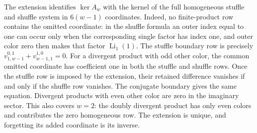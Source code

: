 \documentclass[11pt]{article}
\numberwithin{equation}{section}
\theoremstyle{plain}
\theoremstyle{definition}
\theoremstyle{remark}
\DeclareMathOperator{\Li}{Li}
\begin{document}
The extension identifies $\ker A_w$ with the kernel of the full
homogeneous stuffle and shuffle system in $6(w-1)$ coordinates.
Indeed, no finite-product row contains the omitted coordinate: in the
shuffle formula an outer index equal to one can occur only when the
corresponding single factor has index one, and outer color zero then
makes that factor $\Li_1(1)$. The stuffle boundary row is precisely
$v^{0,1}_{1,w-1}+v^{1,0}_{w-1,1}=0$. For a divergent product with odd
other color, the common omitted coordinate has coefficient one in both
the stuffle and shuffle rows. Once the stuffle row is imposed by the
extension, their retained difference vanishes if and only if the
shuffle row vanishes. The conjugate boundary gives the same equation.
Divergent products with even other color are zero in the imaginary
sector. This also covers $w=2$: the doubly divergent product has only
even colors and contributes the zero homogeneous row. The extension
is unique, and forgetting its added coordinate is its inverse.
\end{document}
